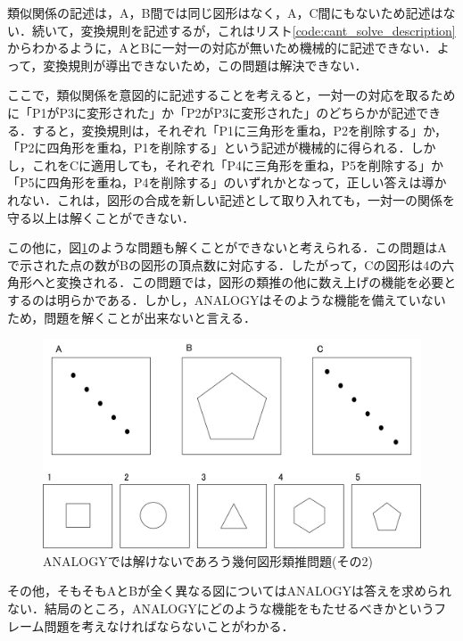 \documentclass{jarticle}
\begin{document}
類似関係の記述は，A，B間では同じ図形はなく，A，C間にもないため記述はない．続いて，変換規則を記述するが，これはリスト\ref{code:cant_solve_description}からわかるように，AとBに一対一の対応が無いため機械的に記述できない．よって，変換規則が導出できないため，この問題は解決できない．

ここで，類似関係を意図的に記述することを考えると，一対一の対応を取るために「P1がP3に変形された」か「P2がP3に変形された」のどちらかが記述できる．すると，変換規則は，それぞれ「P1に三角形を重ね，P2を削除する」か，「P2に四角形を重ね，P1を削除する」という記述が機械的に得られる．しかし，これをCに適用しても，それぞれ「P4に三角形を重ね，P5を削除する」か「P5に四角形を重ね，P4を削除する」のいずれかとなって，正しい答えは導かれない．これは，図形の合成を新しい記述として取り入れても，一対一の関係を守る以上は解くことができない．

この他に，図\ref{fig:cant_solve_2}のような問題も解くことができないと考えられる．この問題はAで示された点の数がBの図形の頂点数に対応する．したがって，Cの図形は4の六角形へと変換される．この問題では，図形の類推の他に数え上げの機能を必要とするのは明らかである．しかし，ANALOGYはそのような機能を備えていないため，問題を解くことが出来ないと言える．
\begin{figure}[H]
	\begin{center}
	\includegraphics[width=13cm]{image/cant_solve_2.png}
	\caption{ANALOGYでは解けないであろう幾何図形類推問題(その2)}
	\label{fig:cant_solve_2}
	\end{center}
\end{figure}

その他，そもそもAとBが全く異なる図についてはANALOGYは答えを求められない．結局のところ，ANALOGYにどのような機能をもたせるべきかというフレーム問題を考えなければならないことがわかる．
\end{document}
